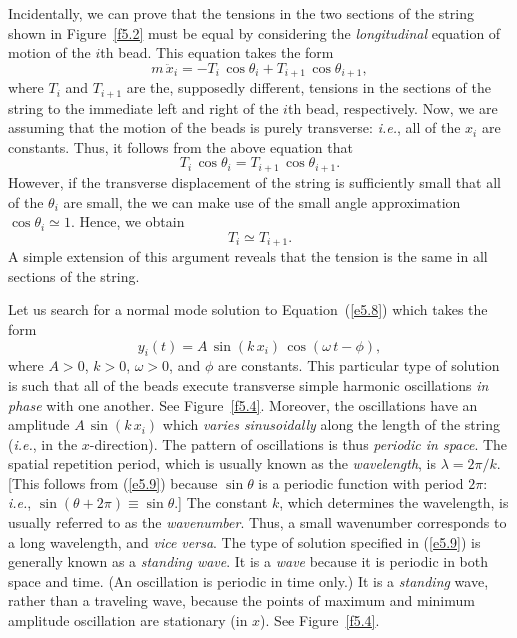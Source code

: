 Incidentally, we can prove that the tensions in the two sections of the string shown in Figure~\ref{f5.2} must be
equal by considering the {\em longitudinal}\/ equation of motion of the $i$th bead. This equation takes the
form
\begin{equation}
m\,\ddot{x}_i=-T_i\,\cos\theta_i +T_{i+1}\,\cos\theta_{i+1},
\end{equation}
where $T_i$ and $T_{i+1}$ are the, supposedly different, tensions in the sections of the string to the
immediate left and right of the $i$th bead, respectively. Now, we are assuming that the motion
of the beads is purely transverse: {\em i.e.}, all of the $x_i$ are constants. Thus, it follows from the
above equation that
\begin{equation}
T_i\,\cos\theta_i = T_{i+1}\,\cos\theta_{i+1}.
\end{equation}
However, if the transverse displacement of the string is sufficiently small that all of the $\theta_i$ are small,
the we can make use of the small angle approximation $\cos\theta_i\simeq 1$. Hence, we
obtain
\begin{equation}
T_i\simeq T_{i+1}.
\end{equation}
A simple extension of this argument reveals that the tension is the same in all sections of the string. 

Let us search for a normal mode solution to Equation~(\ref{e5.8}) which
takes the form
\begin{equation}\label{e5.9}
y_i(t) = A\,\sin(k\,x_i)\,\cos(\omega\,t-\phi),
\end{equation}
where $A>0$, $k>0$, $\omega>0$, and $\phi$ are constants. 
This particular type of solution is such that all of the  beads execute transverse simple harmonic oscillations {\em in phase}\/
with one another. See Figure~\ref{f5.4}. Moreover, the oscillations have an amplitude $A\,\sin(k\,x_i)$
which {\em varies sinusoidally}\/ along the length of the string ({\em i.e.}, in the $x$-direction). The  pattern of oscillations is thus {\em periodic in space}. The spatial repetition period, which is usually known as the {\em wavelength}, is $\lambda=2\pi/k$. [This follows from (\ref{e5.9}) because $\sin\theta$ is a periodic function with period
$2\pi$: {\em i.e.}, $\sin(\theta+2\pi)\equiv \sin\theta$.] The constant $k$, which determines the wavelength, is usually referred to as the {\em wavenumber}.  Thus, a
small wavenumber corresponds to a long wavelength, and {\em vice versa}. 
The type of solution specified in (\ref{e5.9}) is generally
known as a {\em standing wave}.  It is a {\em wave}\/ because it is periodic
in both space and time. (An oscillation is periodic in time only.) It is
a {\em standing}\/ wave, rather than a traveling wave, because the points
of maximum and minimum amplitude oscillation are stationary (in $x$). See Figure~\ref{f5.4}.

